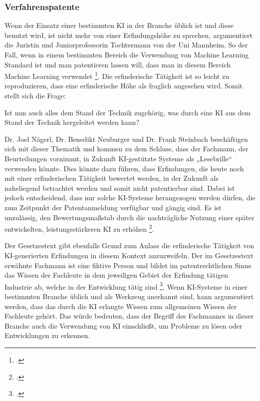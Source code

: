 \subsubsection{Verfahrenspatente}

Wenn der Einsatz einer bestimmten KI in der Branche üblich ist 
und diese benutzt wird,
ist nicht mehr von einer Erfindungshöhe zu sprechen, argumentiert
die Juristin und Juniorprofessorin Tochtermann von der Uni Mannheim.
So der Fall, wenn in einem bestimmten Bereich die Verwendung von
Machine Learning Standard ist und man patentieren lassen will,
dass man in diesem Bereich Machine Learning verwendet \footcite{WieManPatente2021}.
Die erfinderische Tätigkeit ist so leicht zu reproduzieren,
dass eine erfinderische Höhe als fraglich angesehen wird.
Somit stellt sich die Frage: 

Ist nun auch alles dem Stand der Technik zugehörig, was durch eine KI aus dem 
Stand der Technik hergeleitet werden kann? 

Dr. Joel Nägerl, Dr. Benedikt Neuburger und Dr. Frank Steinbach beschäftigen
sich mit dieser Thematik und kommen zu dem Schluss,
dass der Fachmann, der Beurteilungen vornimmt, 
in Zukunft KI-gestützte Systeme als „Lesebrille“ verwenden könnte.
Dies könnte dazu führen, dass Erfindungen, 
die heute noch mit einer erfinderischen Tätigkeit bewertet werden, 
in der Zukunft als naheliegend betrachtet werden und somit nicht patentierbar sind.
Dabei ist jedoch entscheidend, 
dass nur solche KI-Systeme herangezogen werden dürfen, 
die zum Zeitpunkt der Patentanmeldung verfügbar und gängig sind. 
Es ist unzulässig, den Bewertungsmaßstab durch die nachträgliche Nutzung 
einer später entwickelten, leistungsstärkeren KI zu erhöhen 
\footcite{nagerlKunstlicheIntelligenzParadigmenwechsel2019}.

Der Gesetzestext gibt ebenfalls Grund zum Anlass die erfinderische 
Tätigkeit von KI-generierten Erfindungen in diesem Kontext anzuzweifeln.
Der im Gesetzestext erwähnte Fachmann ist eine fiktive Person
und bildet im patentrechtlichen Sinne das Wissen der
Fachleute in dem jeweiligen Gebiet der Erfindung tätigen Industrie ab,
welche in der Entwicklung tätig sind \footcite{asendorfPatGErfindungAuf2023}.
Wenn KI-Systeme in einer bestimmten Branche üblich 
und als Werkzeug anerkannt sind, kann argumentiert werden, 
dass das durch die KI erlangte Wissen 
zum allgemeinen Wissen der Fachleute gehört. 
Das würde bedeuten, dass der Begriff des Fachmannes
in dieser Branche auch die Verwendung von KI einschließt, 
um Probleme zu lösen oder Entwicklungen zu erkennen.

